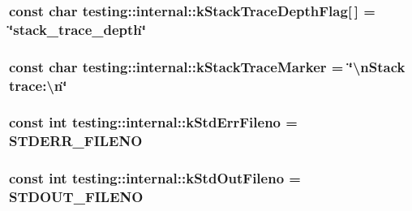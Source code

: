 \subsubsection[{k\+Stack\+Trace\+Depth\+Flag}]{\setlength{\rightskip}{0pt plus 5cm}const char testing\+::internal\+::k\+Stack\+Trace\+Depth\+Flag\mbox{[}$\,$\mbox{]} = \char`\"{}stack\+\_\+trace\+\_\+depth\char`\"{}}\label{namespacetesting_1_1internal_ad6f90e66d431ca3a9084408878c2cc77}
\hypertarget{namespacetesting_1_1internal_abb38528ca6a45df265b19f5ccb3d16d9}{}
\subsubsection[{k\+Stack\+Trace\+Marker}]{\setlength{\rightskip}{0pt plus 5cm}const char testing\+::internal\+::k\+Stack\+Trace\+Marker = \char`\"{}\textbackslash{}n\+Stack trace\+:\textbackslash{}n\char`\"{}}\label{namespacetesting_1_1internal_abb38528ca6a45df265b19f5ccb3d16d9}
\hypertarget{namespacetesting_1_1internal_a747eccfdbdee3ff8af3bedc476a57c85}{}
\subsubsection[{k\+Std\+Err\+Fileno}]{\setlength{\rightskip}{0pt plus 5cm}const int testing\+::internal\+::k\+Std\+Err\+Fileno = S\+T\+D\+E\+R\+R\+\_\+\+F\+I\+L\+E\+N\+O}\label{namespacetesting_1_1internal_a747eccfdbdee3ff8af3bedc476a57c85}
\hypertarget{namespacetesting_1_1internal_a24f0a3d50cac54a9132f4828ec9b96d9}{}
\subsubsection[{k\+Std\+Out\+Fileno}]{\setlength{\rightskip}{0pt plus 5cm}const int testing\+::internal\+::k\+Std\+Out\+Fileno = S\+T\+D\+O\+U\+T\+\_\+\+F\+I\+L\+E\+N\+O}\label{namespacetesting_1_1internal_a24f0a3d50cac54a9132f4828ec9b96d9}
\hypertarget{namespacetesting_1_1internal_a84f8a2102d45c8b2b35be06d14ffefb8}{}
